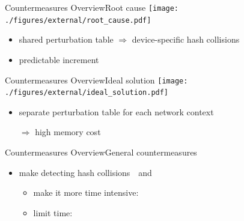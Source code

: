 \documentclass[aspectratio=169, hyperref={colorlinks=true, allcolors=SecondaryColor}, c]{beamer}
\begin{document}
	\begin{frame}[fragile]{Countermeasures Overview}{Root cause}
		\texttt{[image: ./figures/external/root\_cause.pdf]} %
		\begin{itemize}
			\item shared perturbation table \alert{$\Rightarrow$} device-specific hash collisions %
			\item predictable increment
		\end{itemize}
	\end{frame}

	\begin{frame}[fragile]{Countermeasures Overview}{Ideal solution}
		\texttt{[image: ./figures/external/ideal\_solution.pdf]} %
		\begin{itemize}
			\item separate perturbation table for each network context
			\item[\alert{$\Rightarrow$}] high memory cost %
		\end{itemize}
	\end{frame}

	\begin{frame}[fragile]{Countermeasures Overview}{General countermeasures}
		\begin{itemize}
			\item make detecting hash collisions \,{\thickuparrow}\, and \,{\thickdownarrow}\,
			\begin{itemize}
				\item \alert{make it more time intensive}:

				\item \alert{limit time}:
				\vspace{-0.2cm}

			\end{itemize}
		\end{itemize}
	\end{frame}
\end{document}
